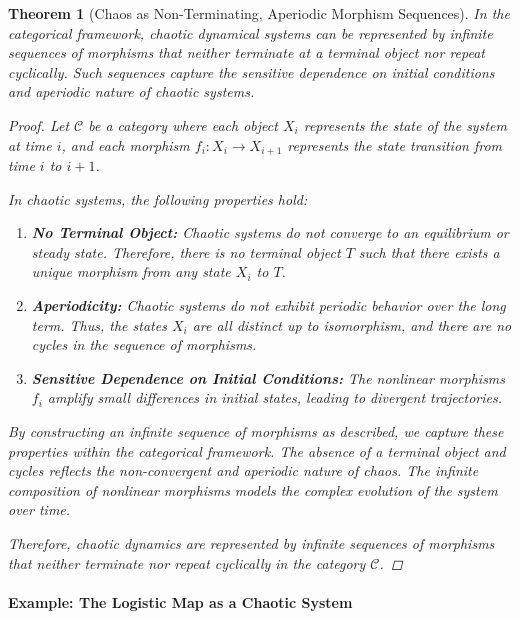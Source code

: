 \documentclass{article}
\newtheorem{theorem}{Theorem}[section]
\theoremstyle{definition}
\theoremstyle{remark}
\begin{document}
	\begin{theorem}[Chaos as Non-Terminating, Aperiodic Morphism Sequences]
		In the categorical framework, chaotic dynamical systems can be represented by infinite sequences of morphisms that neither terminate at a terminal object nor repeat cyclically. Such sequences capture the sensitive dependence on initial conditions and aperiodic nature of chaotic systems.
		
		\begin{proof}
			Let $\mathcal{C}$ be a category where each object $X_i$ represents the state of the system at time $i$, and each morphism $f_i: X_i \rightarrow X_{i+1}$ represents the state transition from time $i$ to $i+1$.
			
			In chaotic systems, the following properties hold:
			
			\begin{enumerate}
				\item \textbf{No Terminal Object:} Chaotic systems do not converge to an equilibrium or steady state. Therefore, there is no terminal object $T$ such that there exists a unique morphism from any state $X_i$ to $T$.
				\item \textbf{Aperiodicity:} Chaotic systems do not exhibit periodic behavior over the long term. Thus, the states $X_i$ are all distinct up to isomorphism, and there are no cycles in the sequence of morphisms.
				\item \textbf{Sensitive Dependence on Initial Conditions:} The nonlinear morphisms $f_i$ amplify small differences in initial states, leading to divergent trajectories.
			\end{enumerate}
			
			By constructing an infinite sequence of morphisms as described, we capture these properties within the categorical framework. The absence of a terminal object and cycles reflects the non-convergent and aperiodic nature of chaos. The infinite composition of nonlinear morphisms models the complex evolution of the system over time.
			
			Therefore, chaotic dynamics are represented by infinite sequences of morphisms that neither terminate nor repeat cyclically in the category $\mathcal{C}$.
		\end{proof}
	\end{theorem}
	
	\paragraph{Example: The Logistic Map as a Chaotic System}
	
\end{document}
